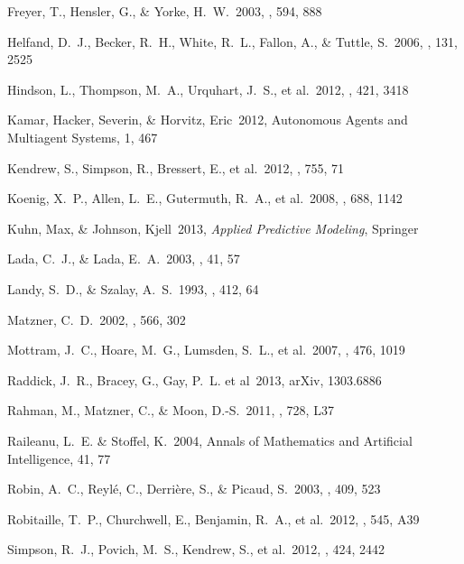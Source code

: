 \documentclass[preprint]{aastex}
\begin{document}
\begin{thebibliography}{16}
 Freyer, T., Hensler, G., 
\& Yorke, H.~W.\ 2003, \apj, 594, 888 

 Helfand, D.~J., Becker, 
R.~H., White, R.~L., Fallon, A., \& Tuttle, S.\ 2006, \aj, 131, 2525 

 Hindson, L., Thompson, 
M.~A., Urquhart, J.~S., et al.\ 2012, \mnras, 421, 3418 

 Kamar, Hacker, Severin, \& Horvitz, Eric\ 2012, Autonomous Agents and Multiagent Systems, 1, 467

 Kendrew, S., Simpson, 
R., Bressert, E., et al.\ 2012, \apj, 755, 71 

 Koenig, X.~P., Allen, 
L.~E., Gutermuth, R.~A., et al.\ 2008, \apj, 688, 1142 

 Kuhn, Max, \& Johnson, Kjell\ 2013, \textit{Applied Predictive Modeling}, Springer

 Lada, C.~J., \& Lada, E.~A.\ 2003, \araa, 41, 57 

 Landy, S.~D., \& Szalay, A.~S.\ 1993, \apj, 412, 64 

 Matzner, C.~D.\ 2002, \apj, 
566, 302 

 Mottram, J.~C., Hoare, M.~G., Lumsden, S.~L., et al.\ 2007, \aap, 476, 1019 

 Raddick, J.~R., Bracey, G., Gay, P.~L. et al\ 2013, arXiv, 1303.6886

 Rahman, M., Matzner, C., 
\& Moon, D.-S.\ 2011, \apjl, 728, L37 

 Raileanu, L.~E. \& Stoffel, K.\ 2004, Annals of Mathematics and Artificial Intelligence, 41, 77

 Robin, A.~C., Reyl{\'e}, C., Derri{\`e}re, S., \& Picaud, S.\ 2003, \aap, 409, 523 

 Robitaille, T.~P., Churchwell, E., Benjamin, R.~A., et al.\ 2012, \aap, 545, A39 

 Simpson, R.~J., Povich, 
M.~S., Kendrew, S., et al.\ 2012, \mnras, 424, 2442 


\end{thebibliography}
\end{document}
